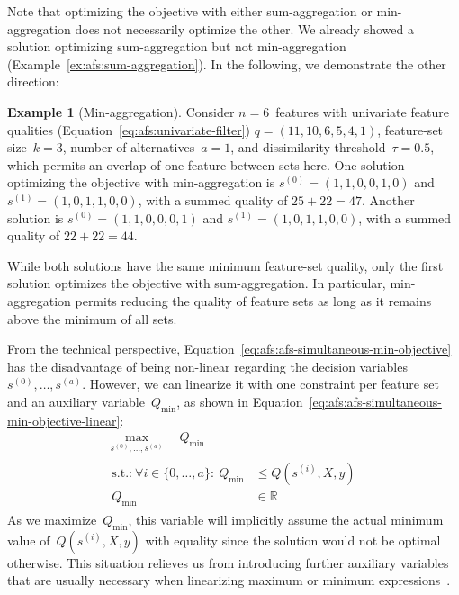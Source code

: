\documentclass[iicol, sn-basic, Numbered]{sn-jnl} %
\theoremstyle{plain}
\theoremstyle{definition}
\newtheorem{example}{Example}
\begin{document}
\begin{appendices}
Note that optimizing the objective with either sum-aggregation or min-aggregation does not necessarily optimize the other.
We already showed a solution optimizing sum-aggregation but not min-aggregation (Example~\ref{ex:afs:sum-aggregation}).
In the following, we demonstrate the other direction:
%
\begin{example}[Min-aggregation]
	Consider $n=6$~features with univariate feature qualities (Equation~\ref{eq:afs:univariate-filter}) $q = (11,10,6,5,4,1)$, feature-set size~$k=3$, number of alternatives~$a=1$, and dissimilarity threshold~$\tau = 0.5$, which permits an overlap of one feature between sets here.
	One solution optimizing the objective with min-aggregation is $s^{(0)} = (1,1,0,0,1,0)$ and $s^{(1)} = (1,0,1,1,0,0)$, with a summed quality of $25+22=47$.
	Another solution is $s^{(0)} = (1,1,0,0,0,1)$ and $s^{(1)} = (1,0,1,1,0,0)$, with a summed quality of $22+22=44$.
	\label{ex:afs:min-aggregation}
\end{example}
%
While both solutions have the same minimum feature-set quality, only the first solution optimizes the objective with sum-aggregation.
In particular, min-aggregation permits reducing the quality of feature sets as long as it remains above the minimum of all sets.

From the technical perspective, Equation~\ref{eq:afs:afs-simultaneous-min-objective} has the disadvantage of being non-linear regarding the decision variables $s^{(0)}, \dots, s^{(a)}$.
However, we can linearize it with one constraint per feature set and an auxiliary variable~$Q_{\text{min}}$, as shown in Equation~\ref{eq:afs:afs-simultaneous-min-objective-linear}:
%
\begin{equation}
	\begin{gathered}
		\max_{s^{(0)}, \dots, s^{(a)}} \quad Q_{\text{min}} \\
		\begin{aligned}
			\text{s.t.:}~\forall i \in \{0, \dots, a\}:~Q_{\text{min}} &\leq Q(s^{(i)},X,y) \\
			Q_{\text{min}} &\in \mathbb{R}
		\end{aligned}
	\end{gathered}
	\label{eq:afs:afs-simultaneous-min-objective-linear}
\end{equation}
%
As we maximize~$Q_{\text{min}}$, this variable will implicitly assume the actual minimum value of~$Q(s^{(i)},X,y)$ with equality since the solution would not be optimal otherwise.
This situation relieves us from introducing further auxiliary variables that are usually necessary when linearizing maximum or minimum expressions~\cite{mosek2022modeling}.


\end{appendices}
\end{document}
